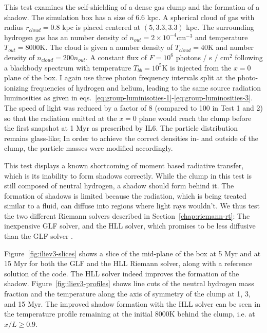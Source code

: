 
This test examines the self-shielding of a dense gas clump and the formation of a shadow. The
simulation box has a size of $6.6$ kpc. A spherical cloud of gas with radius $r_{cloud} = 0.8$ kpc
is placed centered at $(5, 3.3, 3.3)$ kpc. The surrounding hydrogen gas has an number density of
$n_{out} = 2 \times 10^{-4}$cm$^{-3}$ and temperature $T_{out} = 8000$K. The cloud is given a
number density of $T_{cloud} = 40$K and number density of $n_{cloud} = 200 n_{out}$. A constant
flux of $F = 10^6$ photons / s / cm$^2$ following a blackbody spectrum with temperature $T_{bb} =
10^{5}$K is injected from the $x = 0$ plane of the box. I again use three photon frequency
intervals split at the photo-ionizing frequencies of hydrogen and helium, leading to the same source radiation luminosities as given in eqs.~\ref{eq:group-luminisoties-1}-\ref{eq:group-luminosities-3}.
The speed of light was reduced by a factor of 8 (compared to 100 in Test 1 and 2) so that the
radiation emitted at the $x = 0$ plane would reach the clump before the first snapshot at 1 Myr as
prescribed by IL6. The particle distribution remains glass-like; In order to achieve the correct
densities in- and outside of the clump, the particle masses were modified accordingly.

This test displays a known shortcoming of moment based radiative transfer, which is its inability
to form shadows correctly. While the clump in this test is still composed of neutral hydrogen, a
shadow should form behind it. The formation of shadows is limited because the radiation, which is
being treated similar to a fluid, can diffuse into regions where light rays wouldn't. We thus test
the two different Riemann solvers described in Section~\ref{chap:riemann-rt}: The inexpensive GLF
solver, and the HLL solver, which promises to be less diffusive than the GLF solver
\citep{ramses-rt13, gonzalezHERACLESThreedimensionalRadiation2007}.

Figure~\ref{fig:iliev3-slices} shows a slice of the mid-plane of the box at 5 Myr and at 15 Myr for
both the GLF and the HLL Riemann solver, along with a reference solution of the 
code. The HLL solver indeed improves the formation of the shadow. Figure~\ref{fig:iliev3-profiles}
shows line cuts of the neutral hydrogen mass fraction and the temperature along the axis of symmetry
of the clump at 1, 3, and 15 Myr. The improved shadow formation with the HLL solver can be seen in
the temperature profile remaining at the initial $8000$K behind the clump, i.e. at $x/L \geq 0.9$.


